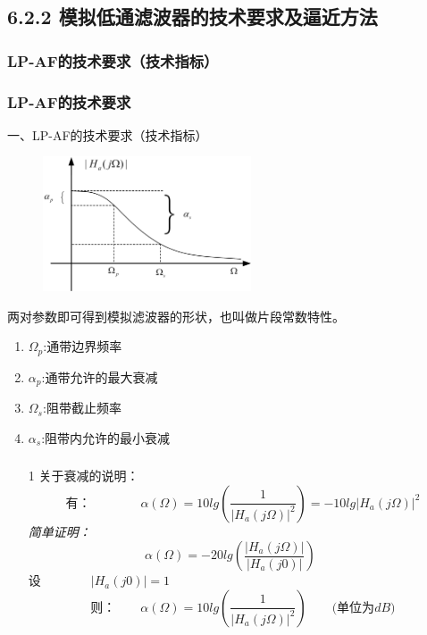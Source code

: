 \documentclass[notheorems,compress,mathserif,table]{beamer}
\begin{document}

\subsection{6.2.2 模拟低通滤波器的技术要求及逼近方法}

\subsubsection{LP-AF的技术要求（技术指标）}

\begin{frame}\frametitle{LP-AF的技术要求}%
一、LP-AF的技术要求（技术指标）
\begin{figure}[h]
  \centering
  \includegraphics[width=0.55\textwidth]{fig6_lpafjszb.jpg}
\end{figure}
两对参数即可得到模拟滤波器的形状，也叫做片段常数特性。
\begin{enumerate}
  \item $\Omega_{p}$:通带边界频率
  \item $\alpha_{p}$:通带允许的最大衰减
  \item $\Omega_{s}$:阻带截止频率
  \item $\alpha_{s}$:阻带内允许的最小衰减
\end{enumerate}
\end{frame}


\begin{frame}\frametitle{}%
\begin{enumerate}
\item [1]关于衰减的说明：
$$\mbox{有：}\quad\quad\quad\quad
\alpha(\Omega) = 10 lg\left(\frac{1}{|H_{a}(j\Omega)|^{2}}\right)= - 10 lg\left|H_{a}(j\Omega)\right|^{2}$$
\emph{ 简单证明：}
$$\alpha(\Omega)
= -20 lg\left(\frac{|H_{a}(j\Omega)|}{|H_{a}(j0)|}\right)\quad\quad$$
设$\quad\quad\quad\quad|H_{a}(j0)|=1 $
$$\mbox{则：}\quad\quad\alpha(\Omega)= 10 lg(\frac{1}{|H_{a}(j\Omega)|^{2}})
\quad\quad\mbox{(单位为$dB$)}$$
\end{enumerate}
\end{frame}
\end{document}
